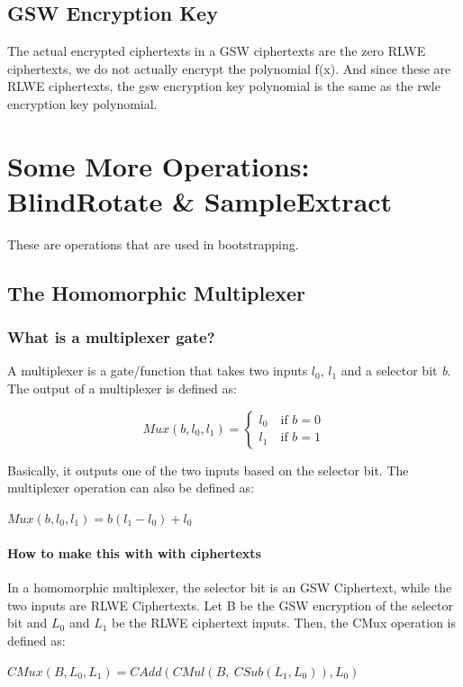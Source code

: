 \documentclass{report}
\begin{document}
\section{GSW Encryption Key}
The actual encrypted ciphertexts in a GSW ciphertexts are the zero RLWE ciphertexts, we do not actually encrypt the polynomial f(x). And since these are RLWE ciphertexts, the gsw encryption key polynomial is the same as the rwle encryption key polynomial.
	
\chapter{Some More Operations: BlindRotate \& SampleExtract}
These are operations that are used in bootstrapping.

\section{The Homomorphic Multiplexer}
\subsection{What is a multiplexer gate?}
A multiplexer is a gate/function that takes two inputs $l_0$, $l_1$ and a selector bit \textit{b}. The output of a multiplexer is defined as:
\begin{center}
	\begin{equation}
		Mux(b, l_0, l_1) = 
		\begin{cases}
			l_0 \quad \text{if } b = 0 \\
			l_1 \quad \text{if } b = 1
		\end{cases}
	\end{equation}
\end{center}
Basically, it outputs one of the two inputs based on the selector bit. The multiplexer operation can also be defined as:
\begin{center}
	$Mux(b, l_0, l_1) =b(l_1 - l_0) + l_0$
\end{center}

\subsubsection{How to make this with with ciphertexts}
In a homomorphic multiplexer, the selector bit is an GSW Ciphertext, while the two inputs are RLWE Ciphertexts. Let B be the GSW encryption of the selector bit and $L_0$ and $L_1$ be the RLWE ciphertext inputs. Then, the CMux operation is defined as:
\begin{center}
	$CMux(B, L_0, L_1) = CAdd(CMul(B, \:CSub(L_1, L_0)), L_0)$
\end{center}
\end{document}
